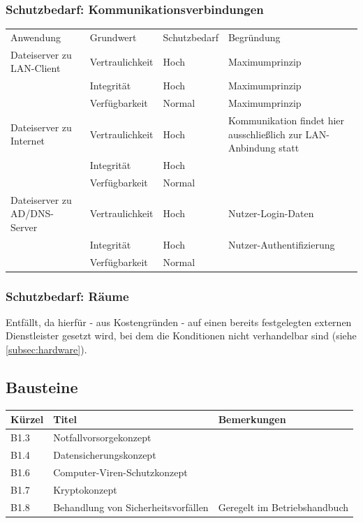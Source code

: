 \subsubsection{Schutzbedarf: Kommunikationsverbindungen}
\begin{minipage}{\textwidth}
\begin{center}
\begin{tabular}{p{3cm}llp{6.8cm}}
\toprule
Anwendung & Grundwert & Schutzbedarf & Begründung \\
Dateiserver zu LAN-Client & Vertraulichkeit & Hoch & Maximumprinzip \\
 & Integrität & Hoch & Maximumprinzip \\
 & Verfügbarkeit & Normal & Maximumprinzip \\
Dateiserver zu Internet & Vertraulichkeit & Hoch & Kommunikation findet hier ausschließlich zur LAN-Anbindung statt \\
 & Integrität & Hoch &  \\
 & Verfügbarkeit & Normal &  \\
Dateiserver zu AD/DNS-Server & Vertraulichkeit & Hoch & Nutzer-Login-Daten \\
 & Integrität & Hoch & Nutzer-Authentifizierung \\
 & Verfügbarkeit & Normal &  \\
\bottomrule
\end{tabular}
\end{center}
\end{minipage}
\bigskip

\subsubsection{Schutzbedarf: Räume}
Entfällt, da hierfür - aus Kostengründen - auf einen bereits festgelegten externen Dienstleister gesetzt wird, bei dem die Konditionen nicht verhandelbar sind (siehe \ref{subsec:hardware}).

\subsection{Bausteine}
\begin{minipage}{\textwidth}
\begin{center}
\begin{tabular}{p{1cm}p{5cm}p{9cm}}
\toprule
Kürzel 	& Titel & Bemerkungen \\
\midrule
B1.3 	& Notfallvorsorgekonzept & \\
B1.4 	& Datensicherungskonzept & \\
B1.6 	& Computer-Viren-Schutzkonzept & \\
B1.7 	& Kryptokonzept	& \\
B1.8 	& Behandlung von \newline Sicherheitsvorfällen & Geregelt im Betriebshandbuch \\
\bottomrule
\end{tabular}
\end{center}
\end{minipage}
\bigskip

